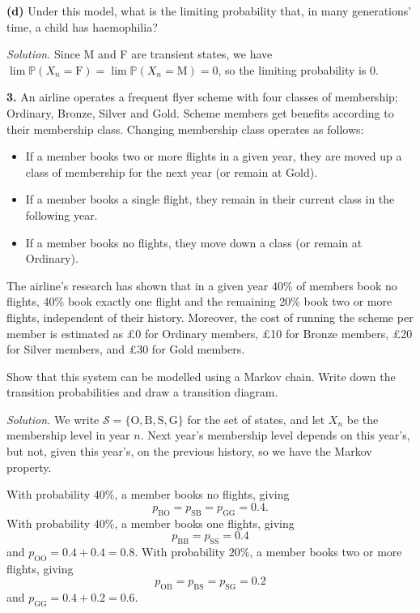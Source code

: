 \documentclass[
  a4paper,
]{article}
\providecommand{\tightlist}{%
  \setlength{\itemsep}{0pt}\setlength{\parskip}{0pt}}
\theoremstyle{definition}
\theoremstyle{definition}
\theoremstyle{definition}
\theoremstyle{remark}
\begin{document}
\textbf{(d)} Under this model, what is the limiting probability that, in many generations' time, a child has haemophilia?

\begin{myanswers}

\emph{Solution.}
Since M and F are transient states, we have \(\lim \mathbb P(X_n = \mathrm F) = \lim \mathbb P(X_n = \mathrm M) = 0\), so the limiting probability is \(0\).

\end{myanswers}

\textbf{3.}
An airline operates a frequent flyer scheme with four classes of membership; Ordinary, Bronze, Silver and Gold. Scheme members get benefits according to their membership class.
Changing membership class operates as follows:

\begin{itemize}
\tightlist
\item
  If a member books two or more flights in a given year, they are moved up a class of membership for the next year (or remain at Gold).
\item
  If a member books a single flight, they remain in their current class in the following year.
\item
  If a member books no flights, they move down a class (or remain at Ordinary).
\end{itemize}

The airline's research has shown that in a given year 40\% of members book no flights, 40\% book exactly one flight and the remaining 20\% book two or more flights, independent of their history. Moreover, the cost of running the scheme per member is estimated as £0 for Ordinary members, £10 for Bronze members, £20 for Silver members, and £30 for Gold members.

Show that this system can be modelled using a Markov chain. Write down the transition probabilities and draw a transition diagram.

\begin{myanswers}

\emph{Solution.}
We write \(\mathcal S = \{\text{O},\text{B},\text{S},\text{G}\}\) for the set of states, and let \(X_n\) be the membership level in year \(n\). Next year's membership level depends on this year's, but not, given this year's, on the previous history, so we have the Markov property.

With probability \(40\%\), a member books no flights, giving
\[ p_{\mathrm{BO}} = p_{\mathrm{SB}} = p_{\mathrm{GG}} = 0.4 . \]
With probability \(40\%\), a member books one flights, giving
\[ p_{\mathrm{BB}} = p_{\mathrm{SS}} = 0.4  \]
and \(p_{\mathrm{OO}} = 0.4+0.4 = 0.8\).
With probability \(20\%\), a member books two or more flights, giving
\[ p_{\mathrm{OB}} = p_{\mathrm{BS}} = p_{\mathrm{SG}} = 0.2  \]
and \(p_{\mathrm{GG}} = 0.4+0.2 = 0.6\).

\end{myanswers}
\end{document}
